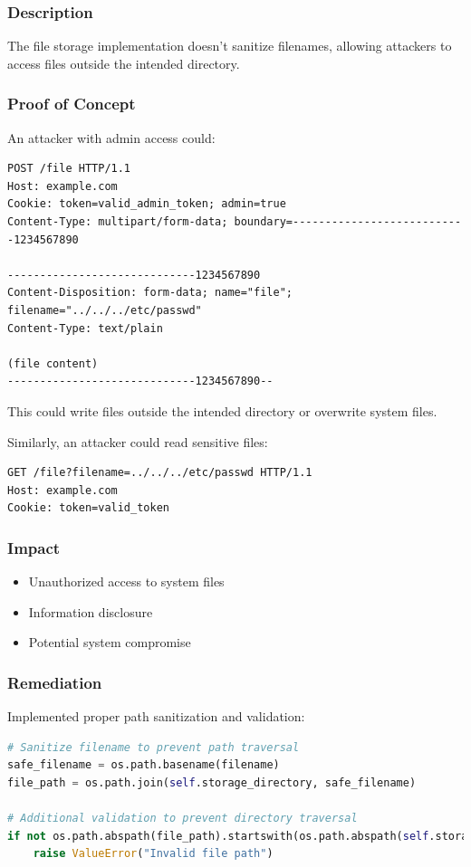 \documentclass[11pt,a4paper]{article}
\newenvironment{vulnerability}[3]{%
    \begin{tcolorbox}[
        colback=white,
        colframe=#1,
        fonttitle=\bfseries\color{white},
        coltitle=#1,
        title=#2: #3
    ]
}{%
    \end{tcolorbox}
}
\begin{document}
\begin{vulnerability}{highcolor}{High}{Path Traversal}
\subsubsection*{Description}
The file storage implementation doesn't sanitize filenames, allowing attackers to access files outside the intended directory.

\subsubsection*{Proof of Concept}
An attacker with admin access could:

\begin{lstlisting}[language=http]
POST /file HTTP/1.1
Host: example.com
Cookie: token=valid_admin_token; admin=true
Content-Type: multipart/form-data; boundary=---------------------------1234567890

-----------------------------1234567890
Content-Disposition: form-data; name="file"; filename="../../../etc/passwd"
Content-Type: text/plain

(file content)
-----------------------------1234567890--
\end{lstlisting}

This could write files outside the intended directory or overwrite system files.

Similarly, an attacker could read sensitive files:

\begin{lstlisting}[language=http]
GET /file?filename=../../../etc/passwd HTTP/1.1
Host: example.com
Cookie: token=valid_token
\end{lstlisting}

\subsubsection*{Impact}
\begin{itemize}
    \item Unauthorized access to system files
    \item Information disclosure
    \item Potential system compromise
\end{itemize}

\subsubsection*{Remediation}
Implemented proper path sanitization and validation:

\begin{lstlisting}[language=Python]
# Sanitize filename to prevent path traversal
safe_filename = os.path.basename(filename)
file_path = os.path.join(self.storage_directory, safe_filename)

# Additional validation to prevent directory traversal
if not os.path.abspath(file_path).startswith(os.path.abspath(self.storage_directory)):
    raise ValueError("Invalid file path")
\end{lstlisting}
\end{vulnerability}
\end{document}
